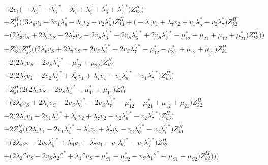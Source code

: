 \begin{align}
 &+2 v_1 \Big(- \lambda^{{\prime},*}_3  - \lambda^{{\prime},*}_6  - \lambda^{\prime}_7  + \lambda^{\prime}_3 + \lambda^{\prime}_6 + \lambda^{{\prime},*}_7\Big)Z_{{k 3}}^{H} \Big)\nonumber \\ 
 &+Z_{{j 1}}^{H} \Big(\Big(3 \lambda_6 v_1  -3 v_1 \lambda_6^*  - \lambda_5 v_2  + v_2 \lambda_5^* \Big)Z_{{k 1}}^{H} +\Big(- \lambda_5 v_1  + \lambda_7 v_2  + v_1 \lambda_5^*  - v_2 \lambda_7^* \Big)Z_{{k 2}}^{H} \nonumber \\ 
 &+\Big(2 \lambda^{\prime}_3 v_S  + 2 \lambda^{\prime}_6 v_S  -2 \lambda^{\prime}_7 v_S  -2 v_S \lambda^{{\prime},*}_3  -2 v_S \lambda^{{\prime},*}_6  + 2 v_S \lambda^{{\prime},*}_7  - \mu_{12}^*  - \mu_{21}  + \mu_{12} + \mu_{21}^*\Big)Z_{{k 3}}^{H} \Big)\Big)\nonumber \\ 
 &+Z_{{i 3}}^{A} \Big(Z_{{j 2}}^{H} \Big(\Big(2 \lambda^{\prime}_6 v_S  + 2 \lambda^{\prime}_7 v_S  -2 v_S \lambda^{{\prime},*}_6  -2 v_S \lambda^{{\prime},*}_7  - \mu_{12}^*  - \mu_{21}^*  + \mu_{12} + \mu_{21}\Big)Z_{{k 1}}^{H} \nonumber \\ 
 &+2 \Big(2 \lambda^{\prime}_5 v_S  -2 v_S \lambda^{{\prime},*}_5  - \mu_{22}^*  + \mu_{22}\Big)Z_{{k 2}}^{H} \nonumber \\ 
 &+2 \Big(2 \lambda^{\prime}_5 v_2  -2 v_2 \lambda^{{\prime},*}_5  + \lambda^{\prime}_6 v_1  + \lambda^{\prime}_7 v_1  - v_1 \lambda^{{\prime},*}_6  - v_1 \lambda^{{\prime},*}_7 \Big)Z_{{k 3}}^{H} \Big)\nonumber \\ 
 &+Z_{{j 1}}^{H} \Big(2 \Big(2 \lambda^{\prime}_4 v_S  -2 v_S \lambda^{{\prime},*}_4  - \mu_{11}^*  + \mu_{11}\Big)Z_{{k 1}}^{H} \nonumber \\ 
 &+\Big(2 \lambda^{\prime}_6 v_S  + 2 \lambda^{\prime}_7 v_S  -2 v_S \lambda^{{\prime},*}_6  -2 v_S \lambda^{{\prime},*}_7  - \mu_{12}^*  - \mu_{21}^*  + \mu_{12} + \mu_{21}\Big)Z_{{k 2}}^{H} \nonumber \\ 
 &+2 \Big(2 \lambda^{\prime}_4 v_1  -2 v_1 \lambda^{{\prime},*}_4  + \lambda^{\prime}_6 v_2  + \lambda^{\prime}_7 v_2  - v_2 \lambda^{{\prime},*}_6  - v_2 \lambda^{{\prime},*}_7 \Big)Z_{{k 3}}^{H} \Big)\nonumber \\ 
 &+2 Z_{{j 3}}^{H} \Big(\Big(2 \lambda^{\prime}_4 v_1  -2 v_1 \lambda^{{\prime},*}_4  + \lambda^{\prime}_6 v_2  + \lambda^{\prime}_7 v_2  - v_2 \lambda^{{\prime},*}_6  - v_2 \lambda^{{\prime},*}_7 \Big)Z_{{k 1}}^{H} \nonumber \\ 
 &+\Big(2 \lambda^{\prime}_5 v_2  -2 v_2 \lambda^{{\prime},*}_5  + \lambda^{\prime}_6 v_1  + \lambda^{\prime}_7 v_1  - v_1 \lambda^{{\prime},*}_6  - v_1 \lambda^{{\prime},*}_7 \Big)Z_{{k 2}}^{H} \nonumber \\ 
 &+\Big(2 \lambda_2'' v_S  -2 v_S \lambda_2''^*  + \lambda_1'' v_S  - \mu_{S1}^*  - \mu_{S2}^*  - v_S \lambda_1''^*  + \mu_{S1} + \mu_{S2}\Big)Z_{{k 3}}^{H} \Big)\Big)\Big)\end{align} 
